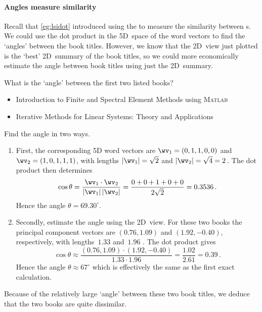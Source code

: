 \paragraph{Angles measure similarity}
Recall that \cref{eg:lsidot} introduced using the  to measure the similarity between s.
We could use the dot product in the 5D~space of the word vectors to find the `angles' between the book titles.
However, we know that the 2D~view just plotted is the `best' 2D~summary of the book titles, so we could more economically estimate the angle between book titles using just the 2D~summary.

\begin{example} 
What is the `angle' between the first two listed books?
\begin{itemize}
\item Introduction to Finite and Spectral Element Methods using \textsc{Matlab}
\item Iterative Methods for Linear Systems: Theory and Applications 
\end{itemize}
\begin{solution} 
Find the angle in two ways.
\begin{enumerate}
\item First, the corresponding 5D word vectors are \(\wv_1=(0,1,1,0,0)\) and \(\wv_2=(1,0,1,1,1)\), with lengths \(|\wv_1|=\sqrt2\) and \(|\wv_2|=\sqrt4=2\)\,.
The dot product then determines
\begin{equation*}
\cos\theta=\frac{\wv_1\cdot\wv_2}{|\wv_1|\,|\wv_2|}
=\frac{0+0+1+0+0}{2\sqrt2} =0.3536\,.
\end{equation*}
Hence the angle \(\theta=69.30^\circ\).
\item Secondly, estimate the angle using the 2D~view.
For these two books the principal component vectors are \((0.76,1.09)\) and \((1.92,-0.40)\), respectively, with lengths~\(1.33\) and~\(1.96\) \twodp.
The dot product gives
\begin{equation*}
\cos\theta\approx \frac{(0.76,1.09)\cdot(1.92,-0.40)}{1.33\cdot 1.96}
= \frac{1.02}{2.61}=0.39\,.
\end{equation*}
Hence the angle \(\theta\approx67^\circ\) which is effectively the same as the first exact calculation.
\end{enumerate}
Because of the relatively large `angle' between these two book titles, we deduce that the two books are quite dissimilar.
\end{solution}
\end{example}

